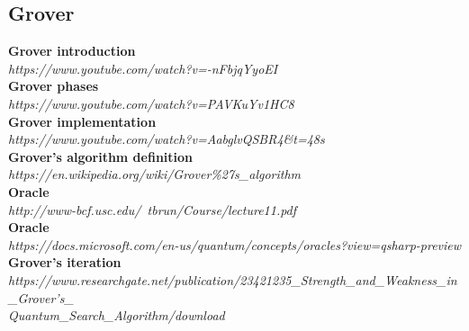 \documentclass[main.tex]{subfiles}
\begin{document}
	\subsection{Grover}
	\textbf{Grover introduction}\\ \textit{https://www.youtube.com/watch?v=-nFbjqYyoEI}\\
	\textbf{Grover phases}\\ \textit{https://www.youtube.com/watch?v=PAVKuYv1HC8}\\
	\textbf{Grover implementation}\\ \textit{https://www.youtube.com/watch?v=AabglvQSBR4\&t=48s}\\
	\textbf{Grover's algorithm definition}\\ \textit{https://en.wikipedia.org/wiki/Grover\%27s\_algorithm}\\
	\textbf{Oracle}\\ \textit{http://www-bcf.usc.edu/~tbrun/Course/lecture11.pdf}\\
	\textbf{Oracle}\\ \textit{https://docs.microsoft.com/en-us/quantum/concepts/oracles?view=qsharp-preview}\\
	\textbf{Grover's iteration}\\ \textit{https://www.researchgate.net/publication/23421235\_Strength\_and\_Weakness\_in\_Grover's\_\\
	Quantum\_Search\_Algorithm/download}\\
\end{document}

